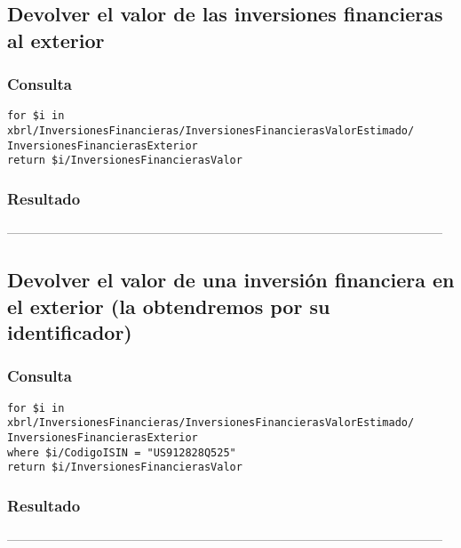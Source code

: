 \documentclass[11pt]{diazessay} %
\begin{document}
\subsection*{Devolver el valor de las inversiones financieras al exterior}
\subsubsection*{Consulta}
\lstset{language=C}
\begin{lstlisting}
for $i in xbrl/InversionesFinancieras/InversionesFinancierasValorEstimado/
InversionesFinancierasExterior
return $i/InversionesFinancierasValor
\end{lstlisting}

\subsubsection*{Resultado}
 
---------------------------------------------------------------------------------------------------------\\

\subsection*{Devolver el valor de una inversión financiera en el exterior (la obtendremos por su identificador)}
\subsubsection*{Consulta}
\lstset{language=C}
\begin{lstlisting}
for $i in xbrl/InversionesFinancieras/InversionesFinancierasValorEstimado/
InversionesFinancierasExterior
where $i/CodigoISIN = "US912828Q525"
return $i/InversionesFinancierasValor
\end{lstlisting}

\subsubsection*{Resultado}
 
---------------------------------------------------------------------------------------------------------\\
\end{document}
